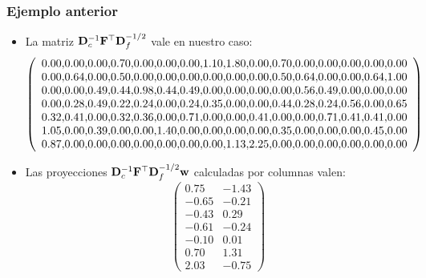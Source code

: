 \begin{frame}
\frametitle{Ejemplo anterior}
\begin{itemize}
\item<2->{La matriz $\mathbf{D}_c^{-1}\mathbf{F}^\top\mathbf{D}_f^{-1/2}$ vale en nuestro caso:
{\tiny
$$
\left(
\begin{array}{r@{}r@{}r@{}r@{}r@{}r@{}r@{}r@{}r@{}r@{}r@{}r@{}r@{}r@{}r@{}r}
0.00, &   0.00, &   0.00, &   0.70, &   0.00, &   0.00, &   0.00, &   1.10, &   1.80, &   0.00, &   0.70, &   0.00, &   0.00, &   0.00, &   0.00, &   0.00 \\
0.00, &   0.64, &   0.00, &   0.50, &   0.00, &   0.00, &   0.00, &   0.00, &   0.00, &   0.00, &   0.50, &   0.64, &   0.00, &   0.00, &   0.64, &   1.00 \\
0.00, &   0.00, &   0.49, &   0.44, &   0.98, &   0.44, &   0.49, &   0.00, &   0.00, &   0.00, &   0.00, &   0.56, &   0.49, &   0.00, &   0.00, &   0.00 \\
0.00, &   0.28, &   0.49, &   0.22, &   0.24, &   0.00, &   0.24, &   0.35, &   0.00, &   0.00, &   0.44, &   0.28, &   0.24, &   0.56, &   0.00, &   0.65 \\
0.32, &   0.41, &   0.00, &   0.32, &   0.36, &   0.00, &   0.71, &   0.00, &   0.00, &   0.41, &   0.00, &   0.00, &   0.71, &   0.41, &   0.41, &   0.00 \\
1.05, &   0.00, &   0.39, &   0.00, &   0.00, &   1.40, &   0.00, &   0.00, &   0.00, &   0.00, &   0.35, &   0.00, &   0.00, &   0.00, &   0.45, &   0.00 \\
0.87, &   0.00, &   0.00, &   0.00, &   0.00, &   0.00, &   0.00, &   0.00, &   1.13, &   2.25, &   0.00, &   0.00, &   0.00, &   0.00, &   0.00, &   0.00
\end{array}
\right)
$$
}
}
\item<3->{Las proyecciones $\mathbf{D}_c^{-1}\mathbf{F}^\top\mathbf{D}_f^{-1/2}\mathbf{w}$ calculadas por columnas valen:
$$
\begin{pmatrix}
0.75 & -1.43 \\
-0.65 & -0.21 \\
-0.43 & 0.29 \\
-0.61 & -0.24 \\
-0.10 & 0.01 \\
0.70 & 1.31 \\
2.03 & -0.75 
\end{pmatrix}
$$}
\end{itemize}
\end{frame}

